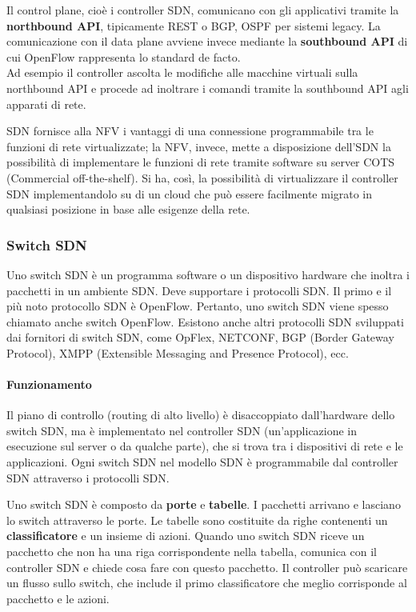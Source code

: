 \documentclass{article}
\begin{document}
		Il control plane, cioè i controller SDN, comunicano con gli applicativi tramite la \textbf{northbound API}, tipicamente REST o BGP, OSPF per sistemi legacy.
		La comunicazione con il data plane avviene invece mediante la \textbf{southbound API} di cui OpenFlow rappresenta lo standard de facto.\\
		Ad esempio il controller ascolta le modifiche alle macchine virtuali sulla northbound API e procede ad inoltrare i comandi tramite la southbound API agli apparati di rete.
		
		SDN fornisce alla NFV i vantaggi di una connessione programmabile tra le funzioni di rete virtualizzate; la NFV, invece, mette a disposizione dell’SDN la possibilità di implementare le funzioni di rete tramite software su server COTS (Commercial off-the-shelf). Si ha, così, la possibilità di virtualizzare il controller SDN implementandolo su di un cloud che può essere facilmente migrato in qualsiasi posizione in base alle esigenze della rete.
		
		\subsubsection{Switch SDN}
		Uno switch SDN è un programma software o un dispositivo hardware che inoltra i pacchetti in un ambiente SDN. Deve supportare i protocolli SDN. Il primo e il più noto protocollo SDN è OpenFlow. Pertanto, uno switch SDN viene spesso chiamato anche switch OpenFlow. Esistono anche altri protocolli SDN sviluppati dai fornitori di switch SDN, come OpFlex, NETCONF, BGP (Border Gateway Protocol), XMPP (Extensible Messaging and Presence Protocol), ecc.
		
		\paragraph{Funzionamento}
		Il piano di controllo (routing di alto livello) è disaccoppiato dall'hardware dello switch SDN, ma è implementato nel controller SDN (un'applicazione in esecuzione sul server o da qualche parte), che si trova tra i dispositivi di rete e le applicazioni.
		Ogni switch SDN nel modello SDN è programmabile dal controller SDN attraverso i protocolli SDN.
		
		Uno switch SDN è composto da \textbf{porte} e \textbf{tabelle}. I pacchetti arrivano e lasciano lo switch attraverso le porte. Le tabelle sono costituite da righe contenenti un \textbf{classificatore} e un insieme di azioni. Quando uno switch SDN riceve un pacchetto che non ha una riga corrispondente nella tabella, comunica con il controller SDN e chiede cosa fare con questo pacchetto. Il controller può scaricare un flusso sullo switch, che include il primo classificatore che meglio corrisponde al pacchetto e le azioni.\\
		
\end{document}
